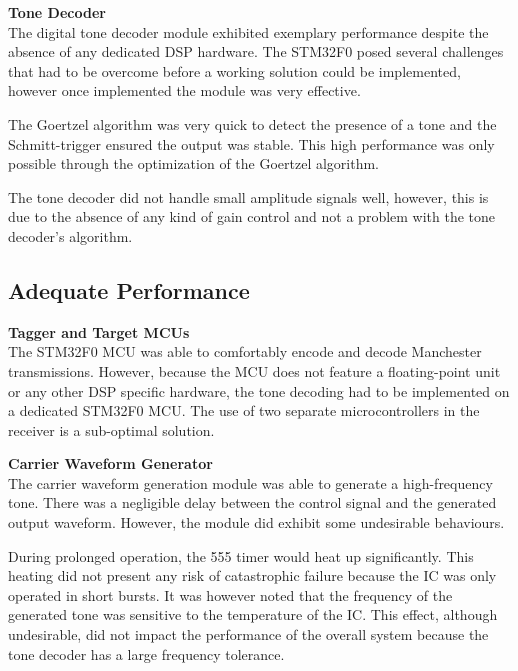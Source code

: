 \textbf{Tone Decoder}\\ %
The digital tone decoder module exhibited exemplary performance despite the absence of any dedicated DSP hardware. The STM32F0 posed several challenges that had to be overcome before a working solution could be implemented, however once implemented the module was very effective.

The Goertzel algorithm was very quick to detect the presence of a tone and the Schmitt-trigger ensured the output was stable. This high performance was only possible through the optimization of the Goertzel algorithm.

The tone decoder did not handle small amplitude signals well, however, this is due to the absence of any kind of gain control and not a problem with the tone decoder's algorithm.

\subsection{Adequate Performance}

\textbf{Tagger and Target MCUs}\\
The STM32F0 MCU was able to comfortably encode and decode Manchester transmissions. However, because the MCU does not feature a floating-point unit or any other DSP specific hardware, the tone decoding had to be implemented on a dedicated STM32F0 MCU. The use of two separate microcontrollers in the receiver is a sub-optimal solution.


\textbf{Carrier Waveform Generator}\\
The carrier waveform generation module was able to generate a high-frequency tone. There was a negligible delay between the control signal and the generated output waveform. However, the module did exhibit some undesirable behaviours.

During prolonged operation, the 555 timer would heat up significantly. This heating did not present any risk of catastrophic failure because the IC was only operated in short bursts. It was however noted that the frequency of the generated tone was sensitive to the temperature of the IC. This effect, although undesirable, did not impact the performance of the overall system because the tone decoder has a large frequency tolerance. 

